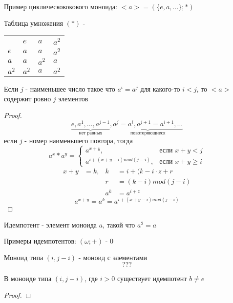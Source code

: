 \documentclass[../main/document.tex]{subfiles}
\begin{document}
\begin{exm}\label{cyclical-exm}
Пример циклическокококого моноида:
$<a>=(\{e,a,...\};*)$

Таблица умножения $(*)$ -
\begin{table}[h]
\centering
\renewcommand*{\arraystretch}{1.4}
\begin{tabular}{|l|l|l|l|}
\hline
  & $e$ & $a$ & $a^2$ \\ \hline
$e$ & $a$ & $a$ & $a^2$ \\ \hline
$a$ & $a$ & $a^2$ & $a$ \\ \hline
$a^2$ & $a^2$ & $a$ & $a^2$ \\
\hline
\end{tabular}
\end{table}
\end{exm}
\begin{thm}
Если $j$ - наименьшее число такое что $a^i=a^j$ для какого-то $i<j$, то $<a>$ содержит ровно $j$ элементов
\begin{proof}
$$\underbrace{e,a^1,...,a^{j-1}}_\text{нет равных},\underbrace{a^j=a^i,a^{j+1}=a^{i+1},...}_\text{повоторяющиеся}$$
если $j$ - номер наименьшего повтора, тогда
$$a^x*a^y=
\begin{cases}
	a^{x+y},& \text{если } x+y<j\\
	a^{i+(x+y-i)mod(j-i)},& \text{если } x+y\geq i
\end{cases}
$$
\begin{align*}
x+y&=k, & k&=i+(k-i\cdot z+r\\
& & r&=(k-i)mod(j-i)\\
& & a^k&=a^{i+z}
\end{align*}
$$a^{x+y}=a^k=a^{i+(x+y-i)mod(j-i)}$$

\end{proof}
\end{thm}

\begin{dfn}
Идемпотент - элемент моноида $a$, такой что $a^2=a$
\end{dfn}

\begin{exm}
Примеры идемпотентов:
$(\omega;+)$ - $0$
\end{exm}

\begin{dfn}
Моноид типа $(i,j-i)$ - моноид с элементами $$???$$
\end{dfn}

\begin{thm}
В моноиде типа $(i,j-i)$, где $i>0$ существует идемпотент $b\neq e$
\begin{proof}

\end{proof}
\end{thm}
\end{document}
